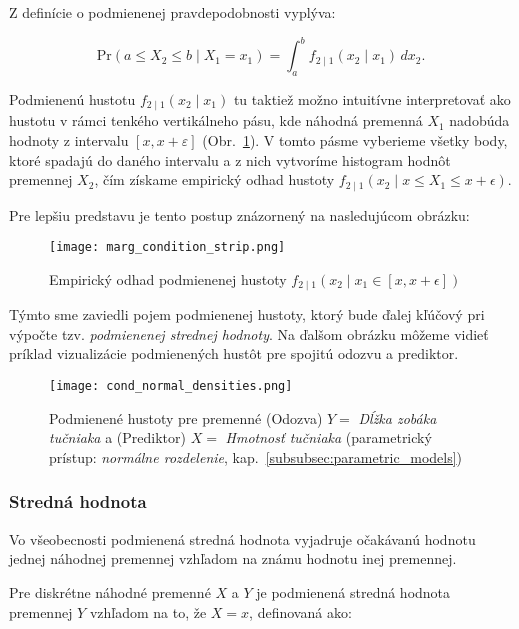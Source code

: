 Z definície o podmienenej pravdepodobnosti vyplýva:

\begin{equation}
\mathrm{Pr}(a \leq X_2 \leq b \mid X_1 = x_1) = \int_a^b f_{2 \mid 1}(x_2 \mid x_1) \, dx_2.
\end{equation}

Podmienenú hustotu $f_{2 \mid 1}(x_2 \mid x_1)$ tu taktiež možno intuitívne interpretovať ako hustotu v rámci tenkého vertikálneho pásu, kde náhodná premenná $X_1$ nadobúda hodnoty z intervalu $[x, x + \varepsilon]$ (Obr.~\ref{fig:cond_density_strip}). V tomto pásme vyberieme všetky body, ktoré spadajú do daného intervalu a z nich vytvoríme histogram hodnôt premennej $X_2$, čím získame empirický odhad hustoty $f_{2 \mid 1}(x_2 \mid x \leq X_1 \leq x +\epsilon)$.

Pre lepšiu predstavu je tento postup znázornený na nasledujúcom obrázku:

\begin{figure}[H]
    \centering
    \texttt{[image: marg\_condition\_strip.png]}
    \caption{Empirický odhad podmienenej hustoty $f_{2 \mid 1}(x_2 \mid x_1 \in [x, x + \epsilon])$}
    \label{fig:cond_density_strip}
\end{figure}

Týmto sme zaviedli pojem podmienenej hustoty, ktorý bude ďalej kľúčový pri výpočte tzv. \textit{podmienenej strednej hodnoty}. Na ďalšom obrázku môžeme vidieť príklad vizualizácie podmienených hustôt pre spojitú odozvu a prediktor.

\begin{figure}[H]
    \centering
    \texttt{[image: cond\_normal\_densities.png]}
    \caption{Podmienené hustoty pre premenné (Odozva) $Y=$ \textit{Dĺžka zobáka tučniaka} a (Prediktor) $X=$ \textit{Hmotnosť tučniaka} (parametrický prístup: \textit{normálne rozdelenie}, kap.~\ref{subsubsec:parametric_models})}
    \label{fig:cond_normal_densities}
\end{figure}

\subsubsection{Stredná hodnota}\label{subsubsec:conditional_mean}

Vo všeobecnosti podmienená stredná hodnota vyjadruje očakávanú hodnotu jednej náhodnej premennej vzhľadom na známu hodnotu inej premennej.

Pre diskrétne náhodné premenné $X$ a $Y$ je podmienená stredná hodnota premennej $Y$ vzhľadom na to, že $X = x$, definovaná ako:

